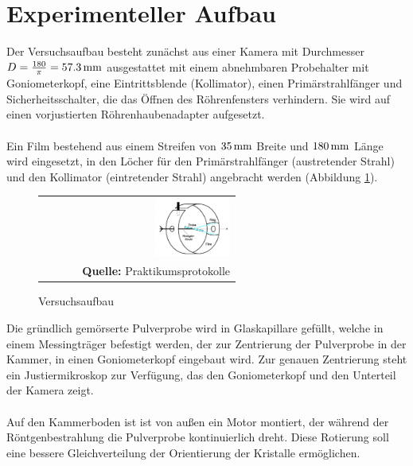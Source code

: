 \documentclass[a4paper,titlepage]{scrartcl}
\numberwithin{equation}{section}
\begin{document}
\section{Experimenteller Aufbau}
Der Versuchsaufbau besteht zunächst aus einer Kamera mit Durchmesser $D=\frac{180}{\pi}=\unit[57.3]{mm}$ ausgestattet mit einem abnehmbaren Probehalter mit Goniometerkopf, eine Eintrittsblende (Kollimator), einen Primärstrahlfänger und Sicherheitsschalter, die das Öffnen des Röhrenfensters verhindern. Sie wird auf einen vorjustierten Röhrenhaubenadapter aufgesetzt.\\ \\
Ein Film bestehend aus einem Streifen von $\unit[35]{mm}$ Breite und $\unit[180]{mm}$ Länge wird eingesetzt, in den Löcher für den Primärstrahlfänger (austretender Strahl) und den Kollimator (eintretender Strahl) angebracht werden (Abbildung \ref{fig:aufbau}).
\begin{figure}[H]
	\centering
	\begin{tabular}{@{}r@{}}
		\includegraphics[width=0.4\textwidth]{aufbau.PNG}\\
		\footnotesize\sffamily\textbf{Quelle:} Praktikumsprotokolle \cite{protokoll1}
	\end{tabular}
	\caption{Versuchsaufbau}
    \label{fig:aufbau}
\end{figure}
Die gründlich gemörserte Pulverprobe wird in Glaskapillare gefüllt, welche in einem Messingträger befestigt werden, der zur Zentrierung der Pulverprobe in der Kammer, in einen Goniometerkopf eingebaut wird. Zur genauen Zentrierung steht ein Justiermikroskop zur Verfügung, das den Goniometerkopf und den Unterteil der Kamera zeigt.\\ \\
Auf den Kammerboden ist ist von außen ein Motor montiert, der während der Röntgenbestrahlung die Pulverprobe kontinuierlich dreht. Diese Rotierung soll eine bessere Gleichverteilung der Orientierung der Kristalle ermöglichen.
\end{document}
